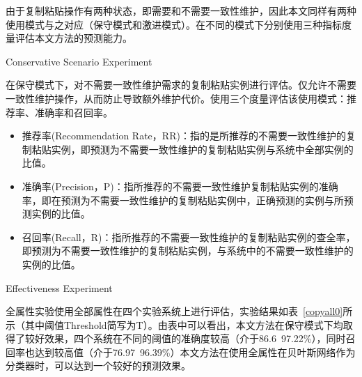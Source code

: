 由于复制粘贴操作有两种状态，即需要和不需要一致性维护，因此本文同样有两种使用模式与之对应（保守模式和激进模式）。在不同的模式下分别使用三种指标度量评估本文方法的预测能力。


{Conservative Scenario Experiment}


在保守模式下，对不需要一致性维护需求的复制粘贴实例进行评估。仅允许不需要一致性维护操作，从而防止导致额外维护代价。使用三个度量评估该使用模式：推荐率、准确率和召回率。
\begin{itemize}
\item	推荐率(Recommendation Rate，RR)：指的是所推荐的不需要一致性维护的复制粘贴实例，即预测为不需要一致性维护的复制粘贴实例与系统中全部实例的比值。
\item  准确率(Precision，P)：指所推荐的不需要一致性维护复制粘贴实例的准确率，即在预测为不需要一致性维护的复制粘贴实例中，正确预测的实例与所预测实例的比值。
\item  召回率(Recall，R)：指所推荐的不需要一致性维护的复制粘贴实例的查全率，即预测为不需要一致性维护的复制粘贴实例，与系统中的不需要一致性维护的实例的比值。
\end{itemize}

{Effectiveness Experiment}

全属性实验使用全部属性在四个实验系统上进行评估，实验结果如表~\ref{copyall0}所示（其中阈值Threshold简写为T）。由表中可以看出，本文方法在保守模式下均取得了较好效果，四个系统在不同的阈值的准确度较高（介于86.6~97.22\%），同时召回率也达到较高值（介于76.97~96.39\%）本文方法在使用全属性在贝叶斯网络作为分类器时，可以达到一个较好的预测效果。

